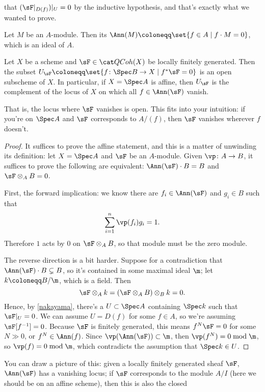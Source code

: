 that $(\sF|_{D(f)})|_U = 0$ by the inductive hypothesis, and that's exactly what we wanted to prove.
\begin{defn}
Let $M$ be an $A$-module. Then its  $\Ann(M)\coloneqq\set{f\in A\mid f\cdot M = 0}$, which is an
ideal of $A$.
\end{defn}
\begin{cor}
Let $X$ be a scheme and $\sF\in\QCoh(X)$ be locally finitely generated. Then the subset $U_\sF\coloneqq\set{f\colon
\Spec B\to X\mid f^*\sF = 0}$ is an open subscheme of $X$. In particular, if $X = \Spec A$ is affine, then $U_\sF$
is the complement of the locus of $X$ on which all $f\in\Ann(\sF)$ vanish.
\end{cor}
That is, the locus where $\sF$ vanishes is open. This fits into your intuition: if you're on $\Spec A$ and $\sF$
corresponds to $A/(f)$, then $\sF$ vanishes wherever $f$ doesn't.
\begin{proof}
It suffices to prove the affine statement, and this is a matter of unwinding its definition: let $X = \Spec A$ and
$\sF$ be an $A$-module. Given $\vp\colon A\to B$, it suffices to prove the following are equivalent:
$\Ann(\sF)\cdot B = B$ and $\sF\otimes_A B = 0$.

First, the forward implication: we know there are $f_i\in\Ann(\sF)$ and $g_i\in B$ such that
\begin{equation}
	\sum_{i=1}^n \vp(f_i)g_i = 1.
\end{equation}
Therefore $1$ acts by $0$ on $\sF\otimes_A B$, so that module must be the zero module.

The reverse direction is a bit harder. Suppose for a contradiction that $\Ann(\sF)\cdot B\subsetneq B$, so it's
contained in some maximal ideal $\m$; let $k\coloneqq B/\m$, which is a field. Then 
\begin{equation}
	\sF\otimes_A k = (\sF\otimes_A B)\otimes_B k = 0.
\end{equation}
Hence, by \cref{nakayama}, there's a $U\subset\Spec A$ containing $\Spec k$ such that $\sF|_U = 0$. We can assume
$U = D(f)$ for some $f\in A$, so we're assuming $\sF[f^{-1}] = 0$. Because $\sF$ is finitely generated, this means
$f^N\sF = 0$ for some $N\gg 0$, or $f^N\in\Ann(f)$. Since $\vp(\Ann(\sF))\subset\m$, then $\vp(f^N) = 0\bmod\m$, so
$\vp(f) = 0\bmod\m$, which contradicts the assumption that $\Spec k\in U$.
\end{proof}
You can draw a picture of this: given a locally finitely generated sheaf $\sF$, $\Ann(\sF)$ has a vanishing locus;
if $\sF$ corresponds to the module $A/I$ (here we should be on an affine scheme), then this is also the closed
